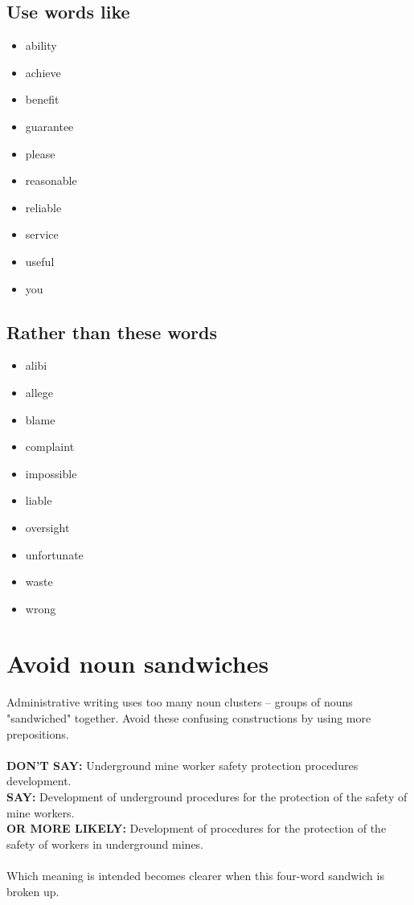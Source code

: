 \documentclass[12pt, letterpaper]{report}
\begin{document}
\begin{linenumbers}
\begin{multicols}
    \subsection*{Use words like}
    \begin{itemize}
        \item ability
        \item achieve
        \item benefit
        \item guarantee
        \item please
        \item reasonable
        \item reliable
        \item service
        \item useful
        \item you
    \end{itemize}
    \subsection*{Rather than these words}
    \begin{itemize}
        \item alibi
        \item allege
        \item blame
        \item complaint
        \item impossible
        \item liable
        \item oversight
        \item unfortunate
        \item waste
        \item wrong
    \end{itemize} 
    \end{multicols}
    \section{Avoid noun sandwiches}
    Administrative writing uses too many noun clusters -- groups of nouns "sandwiched" together. Avoid these confusing constructions by using more prepositions.\\\\
    \textbf{DON'T SAY: }Underground mine worker safety protection procedures development.\\
    \textbf{SAY: }Development of underground procedures for the protection of the safety of mine workers.\\
    \textbf{OR MORE LIKELY: }Development of procedures for the protection of the safety of workers in underground mines.\\\\
    Which meaning is intended becomes clearer when this four-word sandwich is broken up. 

\end{linenumbers}
\end{document}
